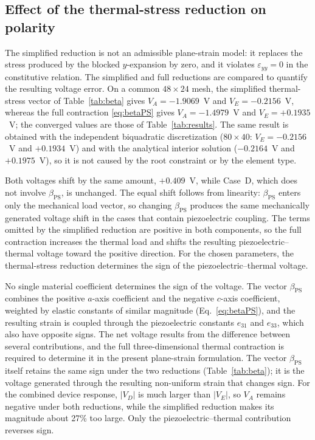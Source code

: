 \documentclass[a4paper,12pt]{elsarticle}
\begin{document}
\subsection{Effect of the thermal-stress reduction on polarity}
\label{sec:polarity}

The simplified reduction is not an admissible plane-strain model: it replaces the stress
produced by the blocked $y$-expansion by zero, and it violates $\varepsilon_{yy}=0$ in the
constitutive relation. The simplified and full reductions are compared to quantify
the resulting voltage error. On a common $48\times24$ mesh, the simplified thermal-stress
vector of Table~\ref{tab:beta} gives $V_A=-1.9069$~V and $V_E=-0.2156$~V, whereas the full
contraction \eqref{eq:betaPS} gives $V_A=-1.4979$~V and $V_E=+0.1935$~V; the converged values
are those of Table~\ref{tab:results}. The same result is obtained with the independent
biquadratic discretization ($80\times40$: $V_E=-0.2156$~V and $+0.1934$~V) and with the
analytical interior solution ($-0.2164$~V and $+0.1975$~V), so it is not caused by the root
constraint or by the element type.

Both voltages shift by the same amount, $+0.409$~V, while Case~D, which does not involve
$\beta_{\mathrm{PS}}$, is unchanged. The equal shift follows from linearity:
$\beta_{\mathrm{PS}}$ enters only the mechanical load vector, so changing $\beta_{\mathrm{PS}}$
produces the same mechanically generated voltage shift in the cases that contain piezoelectric
coupling. The terms omitted by the simplified reduction are positive in both components, so the
full contraction increases the thermal load and shifts the resulting piezoelectric--thermal
voltage toward the positive direction. For the chosen parameters, the thermal-stress reduction
determines the sign of the piezoelectric--thermal voltage.

No single material coefficient determines the sign of the voltage. The vector
$\beta_{\mathrm{PS}}$ combines the positive $a$-axis coefficient and the negative $c$-axis
coefficient, weighted by elastic constants of similar magnitude (Eq.~\eqref{eq:betaPS}), and
the resulting strain is coupled through the piezoelectric constants $e_{31}$ and $e_{33}$,
which also have opposite signs. The net voltage results from the difference between several
contributions, and the full three-dimensional thermal contraction is required to determine it
in the present plane-strain formulation. The vector $\beta_{\mathrm{PS}}$ itself retains the
same sign under the two reductions (Table~\ref{tab:beta}); it is the voltage generated through
the resulting non-uniform strain that changes sign. For the combined device response, $|V_D|$
is much larger than $|V_E|$, so $V_A$ remains negative under both reductions, while the
simplified reduction makes its magnitude about 27\% too large. Only the
piezoelectric--thermal contribution reverses sign.
\end{document}
